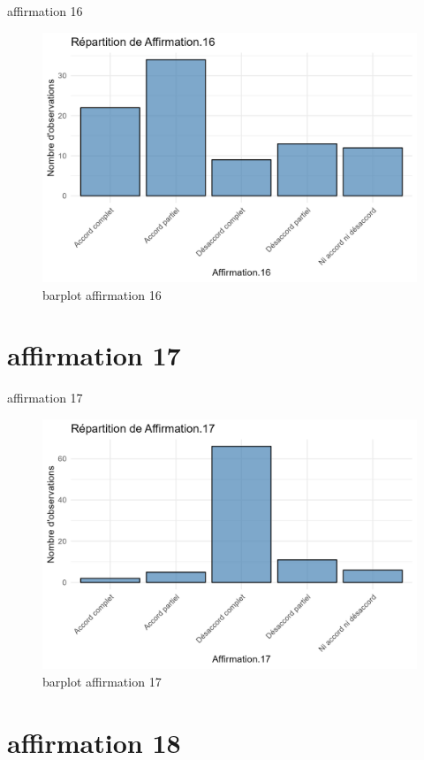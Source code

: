 \documentclass[
]{article}
\begin{document}
affirmation 16

\begin{figure}
\centering
\includegraphics{Image/barplot_Affirmation.16.png}
\caption{barplot affirmation 16}
\end{figure}

\section{affirmation 17}\label{affirmation-17}

affirmation 17

\begin{figure}
\centering
\includegraphics{Image/barplot_Affirmation.17.png}
\caption{barplot affirmation 17}
\end{figure}

\section{affirmation 18}\label{affirmation-18}
\end{document}
